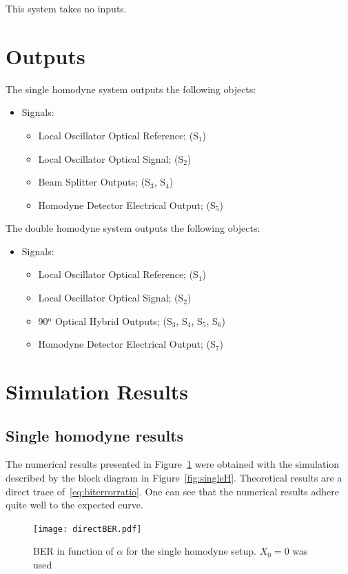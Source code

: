 This system takes no inputs.
%
\section{Outputs}

The single homodyne system outputs the following objects:
\begin{itemize}
\item Signals:
\begin{itemize}
\item Local Oscillator Optical Reference; (S$_{1}$)
\item Local Oscillator Optical Signal; (S$_{2}$)
\item Beam Splitter Outputs; (S$_{3}$, S$_{4}$)
\item Homodyne Detector Electrical Output; (S$_{5}$)
\end{itemize}
\end{itemize}
\par
The double homodyne system outputs the following objects:
\begin{itemize}
\item Signals:
\begin{itemize}
\item Local Oscillator Optical Reference; (S$_{1}$)
\item Local Oscillator Optical Signal; (S$_{2}$)
\item 90$^\text{o}$ Optical Hybrid Outputs; (S$_{3}$, S$_{4}$, S$_{5}$, S$_{6}$)
\item Homodyne Detector Electrical Output; (S$_{7}$)
\end{itemize}
\end{itemize}		

\section{Simulation Results}
\subsection{Single homodyne results}\label{subsec:SHresults}

The numerical results presented in Figure~\ref{fig:directber} were obtained with the simulation described by the block diagram in Figure~\ref{fig:singleH}. Theoretical results are a direct trace of~\eqref{eq:biterrorratio}. One can see that the numerical results adhere quite well to the expected curve.

\begin{figure}[h]
\centering
\texttt{[image: directBER.pdf]}
\caption{BER in function of $\alpha$ for the single homodyne setup. $X_0=0$ was used}
\label{fig:directber}
\end{figure}

